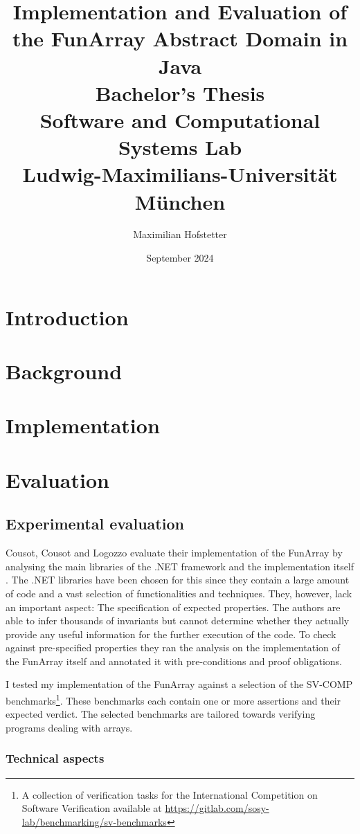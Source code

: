 \documentclass{report}
\title{Implementation and Evaluation of the FunArray Abstract Domain in Java\\[1em]\large{}Bachelor's Thesis\\[1em]Software and Computational Systems Lab\\Ludwig-Maximilians-Universit\"at M\"unchen}
\date{September 2024}
\author{Maximilian Hofstetter}
\begin{document}
\maketitle

\chapter{Introduction}
\chapter{Background}
\chapter{Implementation}
\chapter{Evaluation}

\section{Experimental evaluation}

Cousot, Cousot and Logozzo evaluate their implementation of the FunArray by analysing the main libraries of the .NET framework and the implementation itself \cite{cousot2011}. The .NET libraries have been chosen for this since they contain a large amount of code and a vast selection of functionalities and techniques. They, however, lack an important aspect: The specification of expected properties. The authors are able to infer thousands of invariants but cannot determine whether they actually provide any useful information for the further execution of the code. To check against pre-specified properties they ran the analysis on the implementation of the FunArray itself and annotated it with pre-conditions and proof obligations. 


I tested my implementation of the FunArray against a selection of the SV\nobreakdash-COMP benchmarks\footnote{A collection of verification tasks for the International Competition on Software Verification available at \url{https://gitlab.com/sosy-lab/benchmarking/sv-benchmarks}}. These benchmarks each contain one or more assertions and their expected verdict. The selected benchmarks are tailored towards verifying programs dealing with arrays.

\subsection{Technical aspects}
\end{document}
